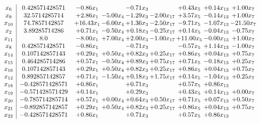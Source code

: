 \documentclass[8pt]{article}
\begin{document}
\[\begin{array}{c| c c@{\hskip 2pt} c@{\hskip 2pt} c@{\hskip 2pt} c@{\hskip 2pt} c@{\hskip 2pt} c@{\hskip 2pt} c@{\hskip 2pt} }
 x_{6}   &  0.428571428571 & -0.86 x_{1} &   & -0.71 x_{3} &   & +  0.43 x_{5} & +  0.14 x_{13} & +  1.00 x_{7}\\
 x_{9}   &  32.5714285714 & +  2.86 x_{1} & -5.00 x_{4} & -1.29 x_{3} & -2.00 x_{17} & +  3.57 x_{5} & -0.14 x_{13} & +  1.00 x_{7}\\
 x_{10}   &  74.7857142857 & + 16.43 x_{1} & -6.00 x_{4} & +  1.36 x_{3} & -2.50 x_{17} & -9.71 x_{5} & -1.07 x_{13} & -21.50 x_{7}\\
 x_{2}   &  3.89285714286 & +  0.71 x_{1} & -0.50 x_{4} & +  0.18 x_{3} & -0.25 x_{17} & +  0.14 x_{5} & -0.04 x_{13} & -0.75 x_{7}\\
 x_{11}   &  8.0 & -8.00 x_{1} & +  7.00 x_{4} & +  2.00 x_{3} & -1.00 x_{17} & + 11.00 x_{5} & -0.00 x_{13} & +  1.00 x_{7}\\
 x_{8}   &  0.428571428571 & -0.86 x_{1} &   & -0.71 x_{3} &   & -0.57 x_{5} & +  1.14 x_{13} & -1.00 x_{7}\\
 x_{14}   &  0.107142857143 & +  0.29 x_{1} & +  0.50 x_{4} & +  0.82 x_{3} & +  0.25 x_{17} & +  0.86 x_{5} & +  0.04 x_{13} & +  0.75 x_{7}\\
 x_{15}   &  0.464285714286 & +  0.57 x_{1} & -0.50 x_{4} & +  0.89 x_{3} & +  0.75 x_{17} & +  0.71 x_{5} & -0.18 x_{13} & +  0.25 x_{7}\\
 x_{16}   &  0.107142857143 & +  0.29 x_{1} & +  0.50 x_{4} & +  0.82 x_{3} & +  0.25 x_{17} & +  0.86 x_{5} & +  0.04 x_{13} & +  0.75 x_{7}\\
 x_{12}   &  0.892857142857 & +  0.71 x_{1} & -1.50 x_{4} & +  0.18 x_{3} & +  1.75 x_{17} & +  0.14 x_{5} & -1.04 x_{13} & +  0.25 x_{7}\\
 x_{18}   &  -0.428571428571 & +  0.86 x_{1} &   & +  0.71 x_{3} &   & +  0.57 x_{5} & +  0.86 x_{13} &   \\
 x_{19}   &  -0.571428571429 & +  0.14 x_{1} &   & +  0.29 x_{3} &   & +  0.43 x_{5} & +  0.14 x_{13} & +  0.00 x_{7}\\
 x_{20}   &  -0.785714285714 & +  0.57 x_{1} & +  0.00 x_{4} & +  0.64 x_{3} & +  0.50 x_{17} & +  0.71 x_{5} & +  0.07 x_{13} & +  0.50 x_{7}\\
 x_{21}   &  -0.892857142857 & +  0.29 x_{1} & +  0.50 x_{4} & +  0.82 x_{3} & +  0.25 x_{17} & +  0.86 x_{5} & +  0.04 x_{13} & +  0.75 x_{7}\\
 x_{22}   &  -0.428571428571 & +  0.86 x_{1} &   & +  0.71 x_{3} &   & +  0.57 x_{5} & +  0.86 x_{13} &   \\

\end{array}\]
\end{document}
